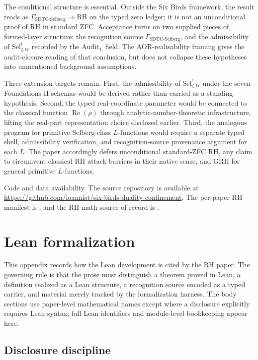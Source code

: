 \documentclass[11pt]{article}
\DeclareMathOperator{\Real}{Re}
\newcommand{\Sel}{\mathrm{Sel}^{!}_{\zeta,\mathrm{tr}}}
\newcommand{\GamSDTCSelberg}{\Gamma_{\mathrm{SDTC\text{-}Selberg}}}
\theoremstyle{definition}
\begin{document}
The conditional structure is essential.  Outside the Six Birds
framework, the result reads as
\(\GamSDTCSelberg\Longrightarrow\mathrm{RH}\) on the typed zero
ledger; it is not an unconditional proof of RH in standard ZFC.
Acceptance turns on two supplied pieces of formed-layer structure:
the recognition source \(\GamSDTCSelberg\), and the admissibility of
\(\Sel\) recorded by the \(\mathrm{Audit}_L\) field.  The
AOR-realisability framing gives the audit-closure reading of that
conclusion, but does not collapse these hypotheses into unmentioned
background assumptions.

Three extension targets remain.  First, the admissibility of
\(\Sel\) under the seven Foundations-II schemas would be derived
rather than carried as a standing hypothesis.  Second, the typed
real-coordinate parameter would be connected to the classical
function \(\Real(\rho)\) through analytic-number-theoretic
infrastructure, lifting the real-part representation choice disclosed
earlier.  Third, the analogous program for primitive Selberg-class
\(L\)-functions would require a separate typed shell, admissibility
verification, and recognition-source provenance argument for each
\(L\).  The paper accordingly defers unconditional standard-ZFC RH,
any claim to circumvent classical RH attack barriers in their native
sense, and GRH for general primitive \(L\)-functions.

Code and data availability.  The source repository is available at
\url{https://github.com/ioannist/six-birds-duality-confinement}.  The
per-paper RH manifest is , and
the RH math source of record is
.
 
\appendix


\section{Lean formalization}
\label{app:formalization}

This appendix records how the Lean development is cited by the RH
paper.  The governing rule is that the prose must distinguish a
theorem proved in Lean, a definition realized as a Lean structure, a
recognition source encoded as a typed carrier, and material merely
tracked by the formalization harness.  The body sections use
paper-level mathematical names except where a disclosure explicitly
requires Lean syntax; full Lean identifiers and module-level
bookkeeping appear here.

\subsection*{Disclosure discipline}
\end{document}
